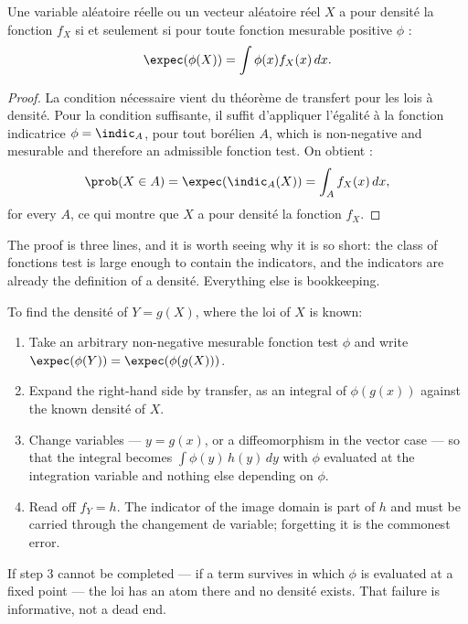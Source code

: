 \begin{prop}
  Une variable aléatoire réelle ou un vecteur aléatoire réel $X$ a pour densité
  la fonction $f_{X}$ si et seulement si pour toute fonction mesurable positive
  $\phi$ :
  \[
    \expec(\phi(X)) = \int \phi(x) f_{X}(x)\,dx .
  \]
\end{prop}

\begin{proof}
  La condition nécessaire vient du théorème de transfert pour les lois à densité.
  Pour la condition suffisante, il suffit d'appliquer l'égalité à la fonction
  indicatrice $\phi = \indic_{A}$, pour tout borélien $A$, which is non-negative
  and mesurable and therefore an admissible fonction test. On obtient :
  \[
    \prob(X \in A) = \expec(\indic_{A}(X)) = \int_{A} f_{X}(x)\,dx ,
  \]
  for every $A$, ce qui montre que $X$ a pour densité la fonction $f_{X}$.
\end{proof}

The proof is three lines, and it is worth seeing why it is so short: the class of
fonctions test is large enough to contain the indicators, and the indicators are
already the definition of a densité. Everything else is bookkeeping.

\begin{remark}
  To find the densité of $Y = g(X)$, where the loi of $X$ is known:
  \begin{enumerate}
    \item Take an arbitrary non-negative mesurable fonction test $\phi$ and
      write $\expec(\phi(Y)) = \expec(\phi(g(X)))$.
    \item Expand the right-hand side by transfer, as an integral of
      $\phi(g(x))$ against the known densité of $X$.
    \item Change variables --- $y = g(x)$, or a diffeomorphism in the vector case ---
      so that the integral becomes $\int \phi(y)\,h(y)\,dy$ with $\phi$
      evaluated at the integration variable and nothing else depending on
      $\phi$.
    \item Read off $f_{Y} = h$. The indicator of the image domain is part of $h$
      and must be carried through the changement de variable; forgetting it is
      the commonest error.
  \end{enumerate}
  If step 3 cannot be completed --- if a term survives in which $\phi$ is
  evaluated at a fixed point --- the loi has an atom there and no densité
  exists. That failure is informative, not a dead end.
\end{remark}

